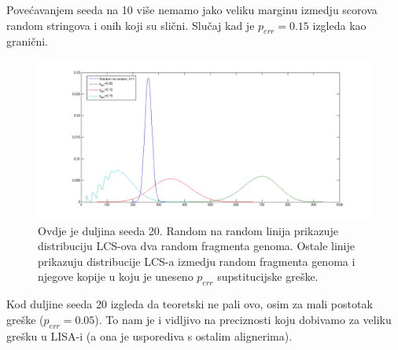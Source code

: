 \documentclass[11pt]{article} %
\begin{document}
Pove\'{c}avanjem seeda na 10 vi\v{s}e nemamo jako veliku marginu izmedju scorova random stringova i onih koji su sli\v{c}ni. Slu\v{c}aj kad je $p_{err}=0.15$ izgleda kao grani\v{c}ni.

\begin{figure}[H]
  \centering
    \includegraphics[width=1\textwidth]{lcs_k20.png}
  \caption{Ovdje je duljina seeda 20. Random na random linija prikazuje distribuciju LCS-ova dva random fragmenta genoma. Ostale linije prikazuju distribucije LCS-a izmedju random fragmenta genoma i njegove kopije u koju je uneseno $p_{err}$ supstitucijske gre\v{s}ke.}
\end{figure}

Kod duljine seeda 20 izgleda da teoretski ne pali ovo, osim za mali postotak gre\v{s}ke ($p_{err}=0.05$). To nam je i vidljivo na preciznosti koju dobivamo za veliku gre\v{s}ku u LISA-i (a ona je usporediva s ostalim alignerima).
\end{document}
